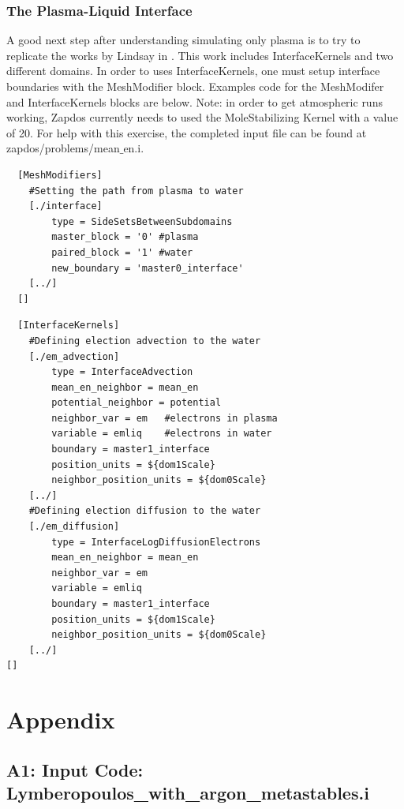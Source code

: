 \documentclass[final]{report}
\begin{document}
  \subsection{The Plasma-Liquid Interface}
  A good next step after understanding simulating only plasma is to try to replicate the works by Lindsay in \cite{plasma_water}. This work includes InterfaceKernels and two different domains. In order to uses InterfaceKernels, one must setup interface boundaries with the MeshModifier block. Examples code for the MeshModifer and InterfaceKernels blocks are below. Note: in order to get atmospheric runs working, Zapdos currently needs to used the MoleStabilizing Kernel with a value of 20. For help with this exercise, the completed input file can be found at \\ zapdos/problems/mean$\_$en.i.

  \begin{verbatim}
  [MeshModifiers]
    #Setting the path from plasma to water
    [./interface]
        type = SideSetsBetweenSubdomains
        master_block = '0' #plasma
        paired_block = '1' #water
        new_boundary = 'master0_interface'
    [../]
  []
  \end{verbatim}

  \begin{verbatim}
  [InterfaceKernels]
    #Defining election advection to the water
    [./em_advection]
        type = InterfaceAdvection
        mean_en_neighbor = mean_en
        potential_neighbor = potential
        neighbor_var = em   #electrons in plasma
        variable = emliq    #electrons in water
        boundary = master1_interface
        position_units = ${dom1Scale}
        neighbor_position_units = ${dom0Scale}
    [../]
    #Defining election diffusion to the water
    [./em_diffusion]
        type = InterfaceLogDiffusionElectrons
        mean_en_neighbor = mean_en
        neighbor_var = em
        variable = emliq
        boundary = master1_interface
        position_units = ${dom1Scale}
        neighbor_position_units = ${dom0Scale}
    [../]
[]
  \end{verbatim}

  \chapter{Appendix} \label{appendix}
  \section*{A1: Input Code: Lymberopoulos\_with\_argon\_metastables.i}
  
\end{document}
